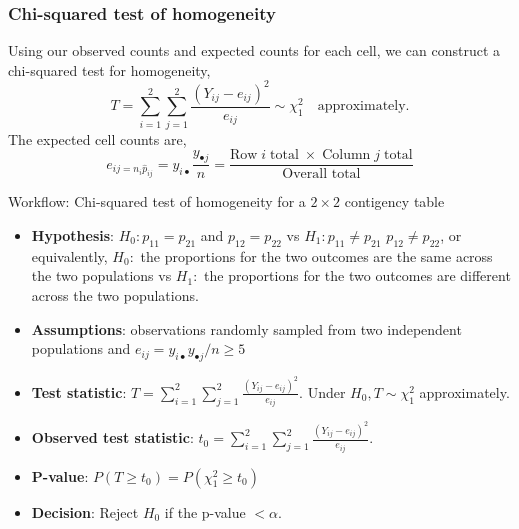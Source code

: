 \documentclass[a4paper]{article}
\begin{document}
\subsubsection{Chi-squared test of homogeneity}
Using our observed counts and expected counts for each cell, we can construct a chi-squared test for homogeneity,
\[
	T = \sum_{i=1}^{2} \sum_{j=1}^{2} \frac{(Y_{ij}-e_{ij})^2}{e_{ij}} \sim \chi_1^2 \quad\text{approximately}.
\]
The expected cell counts are,
\[
	e_{ij = n_i \hat{p}_{ij}} = y_{i \bullet} \frac{y_{\bullet j}}{n} = \frac{\text{Row}\;i\;\text{total}\;\times\;\text{Column}\;j\;\text{total}}{\text{Overall total}}
\]
\begin{redbox}{Workflow: Chi-squared test of homogeneity for a \texorpdfstring{\( 2 \times 2 \)}{2 x 2} contigency table}
	\begin{itemize}
		\item \textbf{Hypothesis}: \( H_0: p_{11} = p_{21} \) and \( p_{12} = p_{22} \) vs \( H_1: p_{11} \neq p_{21} \) \( p_{12} \neq p_{22} \), or equivalently, \( H_0: \) the proportions for the two outcomes are the same across the two populations vs \( H_1: \) the proportions for the two outcomes are different across the two populations. 
		\item \textbf{Assumptions}: observations randomly sampled from two independent populations and \( e_{ij} =y_{i \bullet} y_{\bullet j}/n \geq 5 \)
		\item \textbf{Test statistic}: \( T = \sum\limits_{i=1}^{2}\sum\limits_{j=1}^{2} \frac{(Y_{ij} - e_{ij})^2}{e_{ij}} \). Under \( H_0, T \sim \chi^2_1 \) approximately.
		\item \textbf{Observed test statistic}: \( t_0 = \sum\limits_{i=1}^{2}\sum\limits_{j=1}^{2} \frac{(Y_{ij} - e_{ij})^2}{e_{ij}} \).
		\item \textbf{P-value}: \( P(T\geq t_0) = P(\chi^2_1 \geq t_0) \)
		\item \textbf{Decision}: Reject \( H_0 \) if the p-value \( < \alpha \).
	\end{itemize}
\end{redbox}
\end{document}
